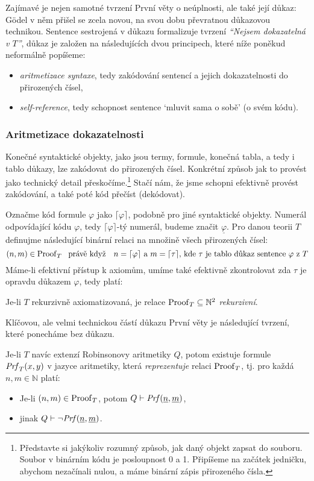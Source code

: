 Zajímavé je nejen samotné tvrzení První věty o neúplnosti, ale také její důkaz: Gödel v něm přišel se zcela novou, na svou dobu převratnou důkazovou technikou. Sentence sestrojená v důkazu formalizuje tvrzení \emph{``Nejsem dokazatelná v $T$''}, důkaz je založen na následujících dvou principech, které níže poněkud neformálně popíšeme:
\begin{itemize}
    \item \emph{aritmetizace syntaxe}, tedy zakódování sentencí a jejich dokazatelnosti do přirozených čísel,
    \item \emph{self-reference}, tedy schopnost sentence `mluvit sama o sobě' (o svém kódu).
\end{itemize}

\subsubsection*{Aritmetizace dokazatelnosti}

Konečné syntaktické objekty, jako jsou termy, formule, konečná tabla, a tedy i tablo důkazy, lze zakódovat do přirozených čísel. Konkrétní způsob jak to provést jako technický detail přeskočíme.\footnote{Představte si jakýkoliv rozumný způsob, jak daný objekt zapsat do souboru. Soubor v binárním kódu je posloupnost 0 a 1. Připíšeme na začátek jedničku, abychom nezačínali nulou, a máme binární zápis přirozeného čísla.} Stačí nám, že jsme schopni efektivně provést zakódování, a také poté kód přečíst (dekódovat).

Označme kód formule $\varphi$ jako $\lceil\varphi\rceil$, podobně pro jiné syntaktické objekty. Numerál odpovídající kódu $\varphi$, tedy $\lceil\varphi\rceil$-tý numerál, budeme značit $\underline{\varphi}$. Pro danou teorii $T$ definujme následující binární relaci na množině všech přirozených čísel:
$$
(n,m)\in\Proof_T\ \text{ právě když \ \ $n=\lceil\varphi\rceil$ a $m=\lceil\tau\rceil$, kde $\tau$ je tablo důkaz sentence $\varphi$ z $T$}
$$
Máme-li efektivní přístup k axiomům, umíme také efektivně zkontrolovat zda $\tau$ je opravdu důkazem $\varphi$, tedy platí:
\begin{observation}
Je-li $T$ rekurzivně axiomatizovaná, je relace $\operatorname{Proof}_T\subseteq\mathbb N^2$ \emph{rekurzivní}. 
\end{observation}

Klíčovou, ale velmi technickou částí důkazu První věty je následující tvrzení, které ponecháme bez důkazu.

\begin{proposition}
Je-li $T$ navíc extenzí Robinsonovy aritmetiky $Q$, potom existuje formule $\mathit{Prf}_T(x,y)$ v jazyce aritmetiky, která \emph{reprezentuje} relaci $\operatorname{Proof}_T$, tj. pro každá $n,m\in\mathbb N$ platí:
\begin{itemize}
    \item Je-li $(n,m)\in\operatorname{Proof}_T$, potom $Q\vdash\mathit{Prf}(\underline{n},\underline{m})$,
    \item jinak $Q\vdash\neg\mathit{Prf}(\underline{n},\underline{m})$.
\end{itemize} 
\end{proposition}

